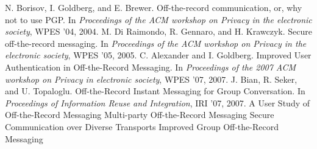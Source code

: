 \begin{thebibliography}{xx}
	 N. Borisov, I. Goldberg, and E. Brewer. Off-the-record communication, or, why not to use PGP. In \textit{Proceedings of the ACM workshop on Privacy in the electronic society}, WPES ’04, 2004.
	 M. Di Raimondo, R. Gennaro, and H. Krawczyk. Secure off-the-record messaging. In \textit{Proceedings of the ACM workshop on Privacy in the electronic society}, WPES ’05, 2005.
	 C. Alexander and I. Goldberg. Improved User Authentication in Off-the-Record Messaging. In \textit{Proceedings of the 2007 ACM workshop on Privacy in electronic society}, WPES ’07, 2007.
	 J. Bian, R. Seker, and U. Topaloglu. Off-the-Record Instant Messaging for Group Conversation. In \textit{Proceedings of Information Reuse and Integration}, IRI ’07, 2007.
	 A User Study of Off-the-Record Messaging
	 Multi-party Off-the-Record Messaging
	 Secure Communication over Diverse Transports
	 Improved Group Off-the-Record Messaging
\end{thebibliography}


